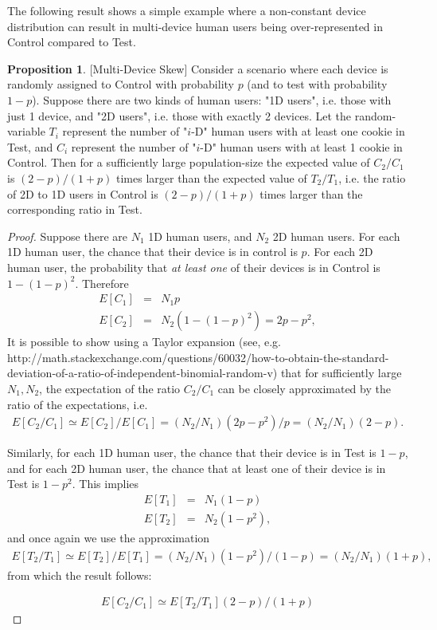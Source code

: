 \documentclass[11pt,a4paper]{article}
\theoremstyle{definition}
\theoremstyle{remark}
\theoremstyle{definition}
\theoremstyle{definition}
\theoremstyle{definition}
\theoremstyle{definition}
\theoremstyle{definition}
\theoremstyle{definition}
\newtheorem{proposition}[theorem]{Proposition}
\begin{document}
The following result shows a simple example where a non-constant device distribution can result in multi-device human users being over-represented in Control compared to Test.
\begin{proposition}\small [Multi-Device Skew] \label{prop-md-skew}
Consider a scenario where each device is randomly assigned to Control with probability $p$ (and to test with probability $1-p$). Suppose there are two kinds of human users: "1D users", i.e. those with just 1 device, and "2D users", i.e. those with exactly 2 devices. Let the random-variable $T_i$ represent the number of "$i$-D" human users with at least one cookie in Test, and $C_i$ represent the number of "$i$-D" human users with at least 1 cookie in Control. Then for a sufficiently large population-size the expected value of $C_2/C_1$ is $(2-p)/(1+p)$ times larger than the expected value of $T_2/T_1$, i.e. the ratio of 2D to 1D users in Control is $(2-p)/(1+p)$ times larger than the corresponding ratio in Test.
\end{proposition}
\begin{proof}\small
Suppose there are $N_1$ 1D human users, and $N_2$ 2D human users.
For each 1D human user, the chance that their device is in control is $p$. For each 2D human user, the probability that \textit{at least one} of their devices is in Control is $1 - (1-p)^2$. Therefore 
\begin{eqnarray*}
	E[C_1] &=& N_1 p\\
	E[C_2] &=& N_2 (1 - (1-p)^2) = 2p - p^2,
\end{eqnarray*}
It is possible to show using a Taylor expansion (see, e.g. http://math.stackexchange.com/questions/60032/how-to-obtain-the-standard-deviation-of-a-ratio-of-independent-binomial-random-v) that for sufficiently large $N_1, N_2$, the expectation of the ratio $C_2/C_1$ can be closely approximated by the ratio of the expectations, i.e. 
\begin{eqnarray*}
E[C_2/C_1] \simeq E[C_2]/E[C_1] = (N_2/N_1)(2p-p^2)/p = (N_2/N_1)(2-p).	
\end{eqnarray*}

Similarly, for each 1D human user, the chance that their device is in Test is $1-p$, and for each 2D human user, the chance that at least one of their device is in Test is $1 - p^2$. This implies
\begin{eqnarray*}
	E[T_1] &=& N_1 (1-p)\\
	E[T_2] &=& N_2 (1 - p^2),
\end{eqnarray*}
and once again we use the approximation
\begin{eqnarray*}
E[T_2/T_1] \simeq E[T_2]/E[T_1] = (N_2/N_1)(1-p^2)/(1-p) = (N_2/N_1)(1+p),
\end{eqnarray*}
from which the result follows:

\begin{eqnarray*}
E[C_2/C_1] \simeq E[T_2/T_1] (2-p)/(1+p)
\end{eqnarray*}

\end{proof}
\end{document}
